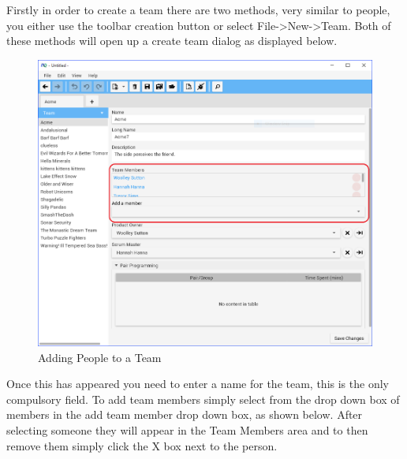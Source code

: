 Firstly in order to create a team there are two methods, very similar to people, you either use the toolbar creation button or select File-\textgreater New-\textgreater Team. Both of these methods will open up a create team dialog as displayed below.

\begin{figure}[H]
	\centering
	\includegraphics[width=\textwidth]{images/screenshots/teams2.PNG}
	\caption{Adding People to a Team}
	\label{fig:new_project}
\end{figure}

Once this has appeared you need to enter a name for the team, this is the only compulsory field. To add team members simply select from the drop down box of members in the add team member drop down box, as shown below. After selecting someone they will appear in the Team Members area and to then remove them simply click the X box next to the person.

